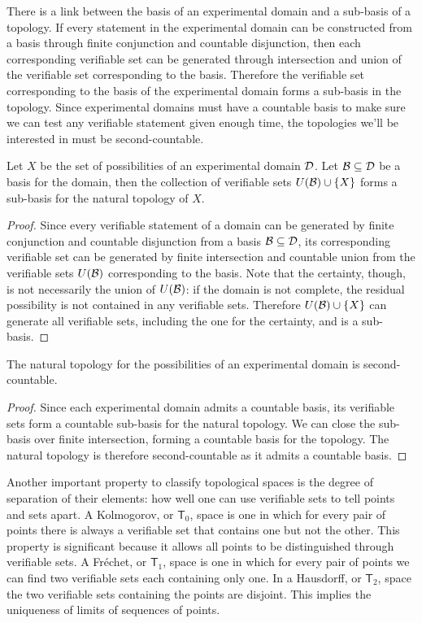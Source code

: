 \documentclass[11pt,letterpaper,fleqn]{memoir} %
\begin{document}
There is a link between the basis of an experimental domain and a sub-basis of a topology. If every statement in the experimental domain can be constructed from a basis through finite conjunction and countable disjunction, then each corresponding verifiable set can be generated through intersection and union of the verifiable set corresponding to the basis. Therefore the verifiable set corresponding to the basis of the experimental domain forms a sub-basis in the topology. Since experimental domains must have a countable basis to make sure we can test any verifiable statement given enough time, the topologies we'll be interested in must be second-countable.

\begin{mathSection}
	\begin{prop}
		Let $X$ be the set of possibilities of an experimental domain $\mathcal{D}$. Let $\mathcal{B} \subseteq \mathcal{D}$ be a basis for the domain, then the collection of verifiable sets $U(\mathcal{B})\cup\{X\}$ forms a sub-basis for the natural topology of $X$.
	\end{prop}
	\begin{proof}
		Since every verifiable statement of a domain can be generated by finite conjunction and countable disjunction from a basis $\mathcal{B} \subseteq \mathcal{D}$, its corresponding verifiable set can be generated by finite intersection and countable union from the verifiable sets $U(\mathcal{B})$ corresponding to the basis. Note that the certainty, though, is not necessarily the union of $U(\mathcal{B})$: if the domain is not complete, the residual possibility is not contained in any verifiable sets. Therefore $U(\mathcal{B})\cup\{X\}$ can generate all verifiable sets, including the one for the certainty, and is a sub-basis.
	\end{proof}
	\begin{prop}
		The natural topology for the possibilities of an experimental domain is second-countable.
	\end{prop}
	\begin{proof}
		Since each experimental domain admits a countable basis, its verifiable sets form a countable sub-basis for the natural topology. We can close the sub-basis over finite intersection, forming a countable basis for the topology. The natural topology is therefore second-countable as it admits a countable basis.
\end{proof}
\end{mathSection}

Another important property to classify topological spaces is the degree of separation of their elements: how well one can use verifiable sets to tell points and sets apart. A Kolmogorov, or $\mathsf{T}_0$, space is one in which for every pair of points there is always a verifiable set that contains one but not the other. This property is significant because it allows all points to be distinguished through verifiable sets. A Fr\'echet, or $\mathsf{T}_1$, space is one in which for every pair of points we can find two verifiable sets each containing only one. In a Hausdorff, or $\mathsf{T}_2$, space the two verifiable sets containing the points are disjoint. This implies the uniqueness of limits of sequences of points.
\end{document}
